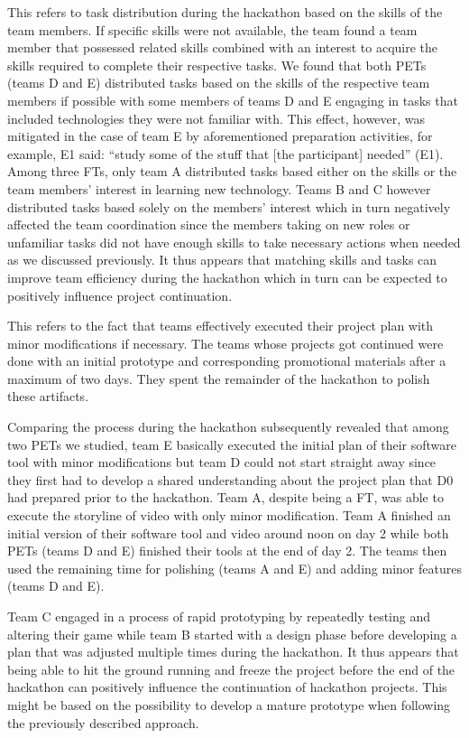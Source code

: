 \documentclass{hcij}
\begin{document}
This refers to task distribution during the hackathon based on the skills of the team members. If specific skills were not available, the team found a team member that possessed related skills combined with an interest to acquire the skills required to complete their respective tasks. We found that both PETs (teams D and E) distributed tasks based on the skills of the respective team members if possible with some members of teams D and E engaging in tasks that included technologies they were not familiar with. This effect, however, was mitigated in the case of team E by aforementioned preparation activities, for example, E1 said: “study some of the stuff that [the participant] needed” (E1). Among three FTs, only team A distributed tasks based either on the skills or the team members’ interest in learning new technology. Teams B and C however distributed tasks based solely on the members’ interest which in turn negatively affected the team coordination since the members taking on new roles or unfamiliar tasks did not have enough skills to take necessary actions when needed as we discussed previously. It thus appears that matching skills and tasks can improve team efficiency during the hackathon which in turn can be expected to positively influence project continuation.

This refers to the fact that teams effectively executed their project plan with minor modifications if necessary. The teams whose projects got continued were done with an initial prototype and corresponding promotional materials after a maximum of two days. They spent the remainder of the hackathon to polish these artifacts.

Comparing the process during the hackathon subsequently revealed that among two PETs we studied, team E basically executed the initial plan of their software tool with minor modifications but team D could not start straight away since they first had to develop a shared understanding about the project plan that D0 had prepared prior to the hackathon. Team A, despite being a FT, was able to execute the storyline of video with only minor modification. Team A finished an initial version of their software tool and video around noon on day 2 while both PETs (teams D and E) finished their tools at the end of day 2. The teams then used the remaining time for polishing (teams A and E) and adding minor features (teams D and E).

Team C engaged in a process of rapid prototyping by repeatedly testing and altering their game while team B started with a design phase before developing a plan that was adjusted multiple times during the hackathon. It thus appears that being able to hit the ground running and freeze the project before the end of the hackathon can positively influence the continuation of hackathon projects. This might be based on the possibility to develop a mature prototype when following the previously described approach.
\end{document}
